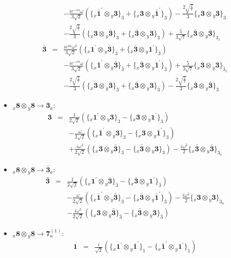 \documentclass[english]{article}
\newcommand{\rep}[1]{\mathbf{#1}}
\newcommand{\repx}[2]{{}_{#2}\mathbf{#1}}
\newcommand{\subcg}[3]{\big\{ \repx{#1}{x}\otimes\repx{#2}{y}\big\}^{}_{#3}}
\begin{document}
\begin{itemize}
\begin{eqnarray*}
 & & -\frac{i e^{-i \alpha } \omega }{3 \sqrt{2}}\left(\subcg{\bar{1}^{\prime}}{3}{3}+\subcg{3}{\bar{1}^{\prime}}{3}\right)-\frac{2 \sqrt{\frac{2}{7}}}{3}\subcg{3}{3}{3} \\ 
 & & -\frac{2 \sqrt{\frac{2}{7}}}{3}\left(\subcg{3}{\bar{3}}{3}+\subcg{\bar{3}}{3}{3}\right)+\frac{5}{3 \sqrt{7}}\subcg{\bar{3}}{\bar{3}}{3_{s}}
\\
\rep{\bar{3}} &=& \frac{i e^{i \alpha } \omega ^2}{3 \sqrt{2}}\left(\subcg{1^{\prime}}{\bar{3}}{\bar{3}}+\subcg{\bar{3}}{1^{\prime}}{\bar{3}}\right) \\ 
 & & -\frac{i e^{-i \alpha } \omega }{3 \sqrt{2}}\left(\subcg{\bar{1}^{\prime}}{\bar{3}}{\bar{3}}+\subcg{\bar{3}}{\bar{1}^{\prime}}{\bar{3}}\right)+\frac{5}{3 \sqrt{7}}\subcg{3}{3}{\bar{3}_{s}} \\ 
 & & -\frac{2 \sqrt{\frac{2}{7}}}{3}\left(\subcg{3}{\bar{3}}{\bar{3}}+\subcg{\bar{3}}{3}{\bar{3}}\right)-\frac{2 \sqrt{\frac{2}{7}}}{3}\subcg{\bar{3}}{\bar{3}}{\bar{3}}
\end{eqnarray*}
\item $\repx{8}{x}\otimes\repx{8}{y}\to\rep{3}_{a}$:
\begin{eqnarray*}
\rep{3} &=& \frac{1}{2 \sqrt{2}}\left(\subcg{1^{\prime}}{3}{3}-\subcg{3}{1^{\prime}}{3}\right) \\ 
 & & -\frac{\omega }{2 \sqrt{2}}\left(\subcg{\bar{1}^{\prime}}{3}{3}-\subcg{3}{\bar{1}^{\prime}}{3}\right) \\ 
 & & +\frac{i \omega ^2}{2 \sqrt{2}}\left(\subcg{3}{\bar{3}}{3}-\subcg{\bar{3}}{3}{3}\right)-\frac{i \omega ^2}{2}\subcg{\bar{3}}{\bar{3}}{3_{a}}
\end{eqnarray*}
\item $\repx{8}{x}\otimes\repx{8}{y}\to\rep{\bar{3}}_{a}$:
\begin{eqnarray*}
\rep{\bar{3}} &=& \frac{1}{2 \sqrt{2}}\left(\subcg{1^{\prime}}{\bar{3}}{\bar{3}}-\subcg{\bar{3}}{1^{\prime}}{\bar{3}}\right) \\ 
 & & -\frac{\omega }{2 \sqrt{2}}\left(\subcg{\bar{1}^{\prime}}{\bar{3}}{\bar{3}}-\subcg{\bar{3}}{\bar{1}^{\prime}}{\bar{3}}\right)-\frac{i \omega ^2}{2}\subcg{3}{3}{\bar{3}_{a}} \\ 
 & & -\frac{i \omega ^2}{2 \sqrt{2}}\left(\subcg{3}{\bar{3}}{\bar{3}}-\subcg{\bar{3}}{3}{\bar{3}}\right)
\end{eqnarray*}
\item $\repx{8}{x}\otimes\repx{8}{y}\to\rep{7}_{a}^{(1)}$:
\begin{eqnarray*}
\rep{1} &=& \frac{i}{\sqrt{2}}\left(\subcg{1^{\prime}}{\bar{1}^{\prime}}{1}-\subcg{\bar{1}^{\prime}}{1^{\prime}}{1}\right)

\end{eqnarray*}
\end{itemize}
\end{document}
